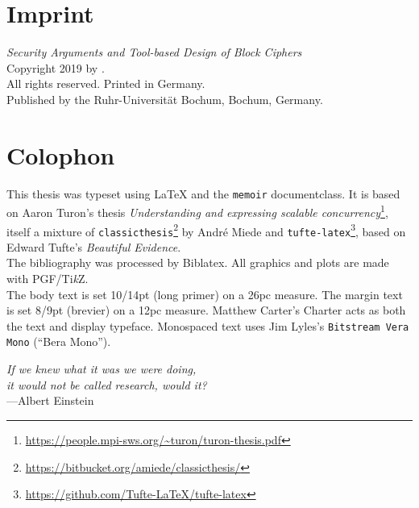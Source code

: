 
\clearpage{}

\thispagestyle{empty}
\hphantom{.}
\vfill

\section*{Imprint}

\textit{Security Arguments and Tool-based Design of Block Ciphers}\\
Copyright \textcopyright{} 2019 by \theauthor{}.\\
All rights reserved. Printed in Germany.\\
Published by the Ruhr-Universität Bochum, Bochum, Germany.

\section*{Colophon}

This thesis was typeset using \LaTeX{} and the \texttt{memoir} documentclass.
It is based on Aaron Turon's thesis \emph{Understanding and expressing scalable concurrency}\footnote{\url{https://people.mpi-sws.org/~turon/turon-thesis.pdf}}, itself a mixture of \texttt{classicthesis}\footnote{\url{https://bitbucket.org/amiede/classicthesis/}} by Andr\'e Miede and \texttt{tufte-latex}\footnote{\url{https://github.com/Tufte-LaTeX/tufte-latex}}, based on Edward Tufte's \emph{Beautiful Evidence}.\\[0.5\baselineskip]
%
The bibliography was processed by Biblatex.
All graphics and plots are made with PGF/Ti\emph{k}Z.\\[0.5\baselineskip]
%
The body text is set 10/14pt (long primer) on a 26pc measure.
The margin text is set 8/9pt (brevier) on a 12pc measure.
Matthew Carter's \textrm{Charter} acts as both the text and display typeface.
Monospaced text uses Jim Lyles's \texttt{Bitstream Vera Mono} (\enquote{Bera Mono}).

\clearpage{}

\thispagestyle{empty}
\vphantom{.}
\vfill
{%
    \flushright{}
    \emph{If we knew what it was we were doing,\\
          it would not be called research, would it?}\\
    \hfill---Albert Einstein
}
\vfill
\vfill

\clearpage{}
